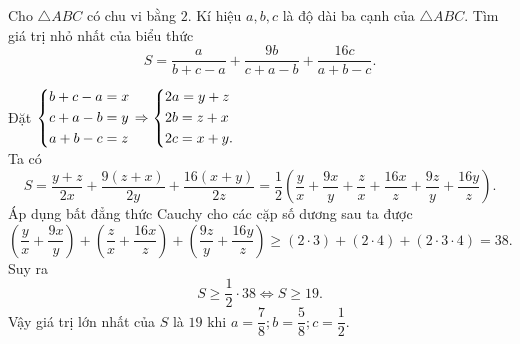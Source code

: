 \begin{ex}%
	Cho $\triangle ABC$ có chu vi bằng $2$. Kí hiệu $a,b,c$ là độ dài ba cạnh của $\triangle ABC$. Tìm giá trị nhỏ nhất của biểu thức
	$$S=\dfrac{a}{b+c-a}+\dfrac{9b}{c+a-b}+\dfrac{16c}{a+b-c}.$$
	
	\loigiai
	{
	Đặt $\left\{\begin{aligned}&b+c-a=x\\&c+a-b=y\\&a+b-c=z\end{aligned}\right.\Rightarrow\left\{\begin{aligned}&2a=y+z\\&2b=z+x\\&2c=x+y.\end{aligned}\right.$\\Ta có $$S=\dfrac{y+z}{2x}+\dfrac{9(z+x)}{2y}+\dfrac{16(x+y)}{2z}=\dfrac{1}{2}\left( \dfrac{y}{x}+\dfrac{9x}{y}+\dfrac{z}{x}+\dfrac{16x}{z}+\dfrac{9z}{y}+\dfrac{16y}{z}\right).$$
	Áp dụng bất đẳng thức Cauchy cho các cặp số dương sau ta được
	$$\left(\dfrac{y}{x}+\dfrac{9x}{y}\right)+\left(\dfrac{z}{x}+\dfrac{16x}{z}\right)+\left(\dfrac{9z}{y}+\dfrac{16y}{z}\right)\ge (2\cdot3)+(2\cdot4)+(2\cdot3\cdot4)=38.$$
	Suy ra
	$$S\ge \dfrac{1}{2}\cdot 38 \Leftrightarrow S\ge 19.$$
	Vậy giá trị lớn nhất của $S$ là $19$ khi $a=\dfrac{7}{8}; b=\dfrac{5}{8}; c=\dfrac{1}{2}$.\\
	}

\end{ex}